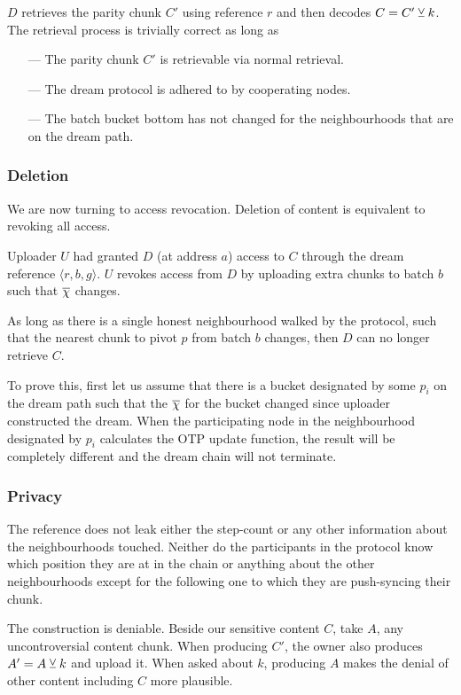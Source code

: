 $D$ retrieves the parity chunk $C'$ using reference $r$ and then decodes $C=C'\veebar k$.
The retrieval process is trivially correct as long as 
\begin{enumerate}[noitemsep]
\item[---]  The parity chunk $C'$ is retrievable via normal retrieval. 
\item[---] The dream protocol is adhered to by cooperating nodes.
\item[---] The batch bucket bottom has not changed for the neighbourhoods that are on the dream path. 
\end{enumerate}

\subsubsection{Deletion}
We are now turning to access revocation. Deletion of content is equivalent to revoking all access.


Uploader $U$ had granted $D$ (at address $a$) access to $C$ through the dream reference $\langle r,b,g\rangle $. $U$ revokes access from $D$ by uploading extra chunks to batch $b$ such that $\overline{\Huge\chi}$ changes.

As long as there is a single honest neighbourhood walked by the protocol, such that the nearest chunk to pivot $p$ from batch $b$ changes, then $D$ can no longer retrieve $C$.

To prove this, first let us assume that there is a bucket designated by some $p_i$ on the dream path such that the $\overline{\Huge\chi}$ for the bucket changed since uploader constructed the dream. When the participating node in the neighbourhood designated by $p_i$ calculates the OTP update function, the result will be completely different and the dream chain will not terminate. 

\subsubsection{Privacy}


The reference does not leak either the step-count or any other information about the neighbourhoods touched. Neither do the participants in the protocol know which position they are at in the chain or anything  about the other neighbourhoods except for the following one to which they are push-syncing their chunk.

The construction is deniable.
Beside our sensitive content $C$, take $A$, any uncontroversial content chunk. When producing $C'$, the owner also produces  $A'=A\veebar k$ and upload it. When asked about $k$, producing $A$ makes the denial of other content including $C$ more plausible. 


